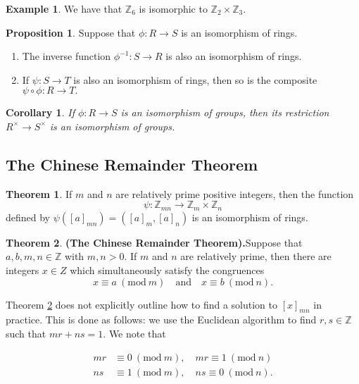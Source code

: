 \documentclass[12pt, a4paper]{article}
\newcommand{\bb}[1]{\mathbb{#1}}
\newcommand{\Mod}[1]{\ (\mathrm{mod}\ #1)}
\theoremstyle{definition}
\newtheorem{theorem}{Theorem}[section]
\newtheorem*{example}{Example}
\newtheorem{proposition}{Proposition}
\theoremstyle{plain}
\newtheorem{corollary}{Corollary}[theorem]
\begin{document}
\begin{example}
We have that $\bb{Z}_6$ is isomorphic to $\bb{Z}_2 \times \bb{Z}_3.$
\end{example}

\begin{proposition}
Suppose that $\phi : R \to S$ is an isomorphism of rings.
\begin{enumerate}

	\item The inverse function $\phi^{-1} : S \to R$ is also an isomorphism of rings.

	\item If $\psi : S \to T$ is also an isomorphism of rings, then so is the composite $\psi \circ \phi : R \to T.$

\end{enumerate}
\end{proposition}

\begin{corollary}
If $\phi : R \to S$ is an isomorphism of groups, then its restriction $R^{\times} \to S^{\times}$ is an isomorphism of groups.
\end{corollary}

\subsection{The Chinese Remainder Theorem}

\begin{theorem}
If $m$ and $n$ are relatively prime positive integers, then the function 
$$\psi : \bb{Z}_{mn} \to \bb{Z}_m \times \bb{Z}_n$$
defined by $\psi([a]_{mn})=([a]_m,[a]_n)$ is an isomorphism of rings.
\end{theorem}

\begin{theorem}\textbf{(The Chinese Remainder Theorem).}\label{theorem:CRT}
Suppose that $a,b,m,n \in \bb{Z}$ with $m,n > 0.$ If $m$ and $n$ are relatively prime, then there are integers $x \in Z$ which simultaneously satisfy the congruences 
$$x \equiv a \Mod{m} \quad \text{and} \quad x\equiv b \Mod{n}.$$
\end{theorem}

Theorem \ref{theorem:CRT} does not explicitly outline how to find a solution to $[x]_{mn}$ in practice. This is done as follows: we use the Euclidean algorithm to find $r,s \in \bb{Z}$ such that $mr+ns=1.$ We note that

$$\begin{aligned}
mr &\equiv 0 \Mod{m}, \quad mr \equiv 1 \Mod{n} \\
ns &\equiv 1 \Mod{m}, \quad ns \equiv 0 \Mod{n}.
\end{aligned}$$
\end{document}
